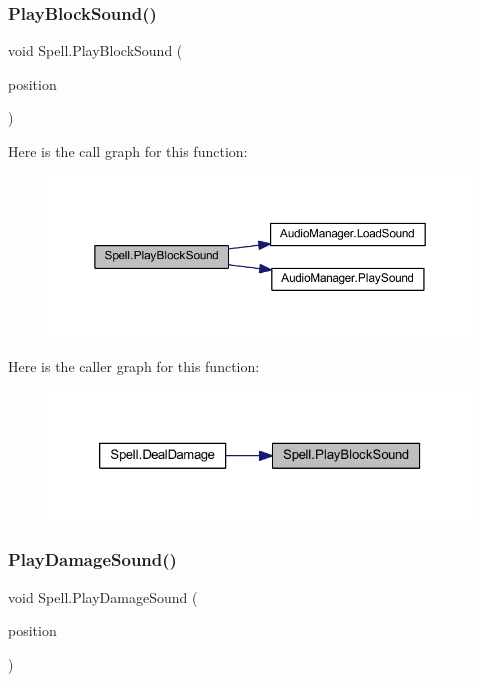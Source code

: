 \mbox{\label{class_spell_a14ec832bc720a2763ff8a09f81d7c5d4}} 
\subsubsection{\texorpdfstring{PlayBlockSound()}{PlayBlockSound()}}
{\footnotesize\ttfamily void Spell.\+Play\+Block\+Sound (\begin{DoxyParamCaption}\item[{Vector2\+Int}]{position }\end{DoxyParamCaption})}

Here is the call graph for this function\+:\nopagebreak
\begin{figure}[H]
\begin{center}
\leavevmode
\includegraphics[width=350pt]{class_spell_a14ec832bc720a2763ff8a09f81d7c5d4_cgraph}
\end{center}
\end{figure}
Here is the caller graph for this function\+:\nopagebreak
\begin{figure}[H]
\begin{center}
\leavevmode
\includegraphics[width=326pt]{class_spell_a14ec832bc720a2763ff8a09f81d7c5d4_icgraph}
\end{center}
\end{figure}
\mbox{\label{class_spell_a80aa52e9ed4b3555bd04682d93bc5049}} 
\subsubsection{\texorpdfstring{PlayDamageSound()}{PlayDamageSound()}}
{\footnotesize\ttfamily void Spell.\+Play\+Damage\+Sound (\begin{DoxyParamCaption}\item[{Vector2\+Int}]{position }\end{DoxyParamCaption})}

